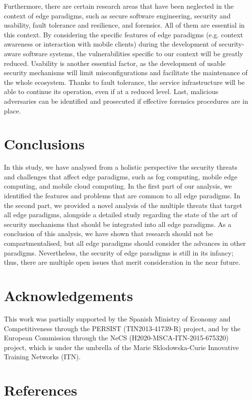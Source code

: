 \documentclass[twocolumn,preprint,3p]{elsarticle}
\begin{document}
Furthermore, there are certain research areas that have been neglected in the context of edge paradigms, such as secure software engineering, security and usability, fault tolerance and resilience, and forensics. All of them are essential in this context. By considering the specific features of edge paradigms (e.g. context awareness or interaction with mobile clients) during the development of security-aware software systems, the vulnerabilities specific to our context will be greatly reduced. Usability is another essential factor, as the development of usable security mechanisms will limit misconfigurations and facilitate the maintenance of the whole ecosystem. Thanks to fault tolerance, the service infrastructure will be able to continue its operation, even if at a reduced level. Last, malicious adversaries can be identified and prosecuted if effective forensics procedures are in place.




\section{Conclusions}
\label{conclusions}

In this study, we have analysed from a holistic perspective the security threats and challenges that affect edge paradigms, such as fog computing, mobile edge computing, and mobile cloud computing. In the first part of our analysis, we identified the features and problems that are common to all edge paradigms. In the second part, we provided a novel analysis of the multiple threats that target all edge paradigms, alongside a detailed study regarding the state of the art of security mechanisms that should be integrated into all edge paradigms. As a conclusion of this analysis, we have shown that research should not be compartmentalised, but all edge paradigms should consider the advances in other paradigms. Nevertheless, the security of edge paradigms is still in its infancy; thus, there are multiple open issues that merit consideration in the near future.



\section*{Acknowledgements}

This work was partially supported by the Spanish Ministry of Economy and Competitiveness through the PERSIST (TIN2013-41739-R) project, and by the European Commission through the NeCS (H2020-MSCA-ITN-2015-675320) project, which is under the umbrella of the Marie Sklodowska-Curie Innovative Training Networks (ITN).







\section*{References}



\end{document}
